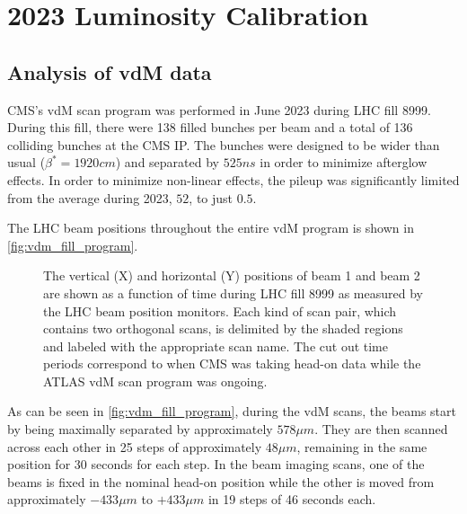 \chapter{2023 Luminosity Calibration}
\label{ch:2023_luminosity_calibration}

\section{Analysis of vdM data}

CMS's vdM scan program was performed in June 2023 during LHC fill 8999. During this fill, there were 138 filled bunches per beam and a total of 136 colliding bunches at the CMS IP. The bunches were designed to be wider than usual ($\beta^{*} = 1920 cm$) and separated by $525 ns$ in order to minimize afterglow effects. In order to minimize non-linear effects, the pileup was significantly limited from the average during 2023, $52$, to just $0.5$.

The LHC beam positions throughout the entire vdM program is shown in \autoref{fig:vdm_fill_program}.

\begin{figure}[!htb]
	\centering
	\caption[Beam positions during fill 8999]{The vertical (X) and horizontal (Y) positions of beam 1 and beam 2 are shown as a function of time during LHC fill 8999 as measured by the LHC beam position monitors. Each kind of scan pair, which contains two orthogonal scans, is delimited by the shaded regions and labeled with the appropriate scan name. The cut out time periods correspond to when CMS was taking head-on data while the ATLAS vdM scan program was ongoing.}
	\label{fig:vdm_fill_program}
\end{figure}

As can be seen in \autoref{fig:vdm_fill_program}, during the vdM scans, the beams start by being maximally separated by approximately $578 \mu m$. They are then scanned across each other in 25 steps of approximately $48 \mu m$, remaining in the same position for 30 seconds for each step. In the beam imaging scans, one of the beams is fixed in the nominal head-on position while the other is moved from approximately $-433 \mu m$ to $+433 \mu m$ in 19 steps of 46 seconds each.

